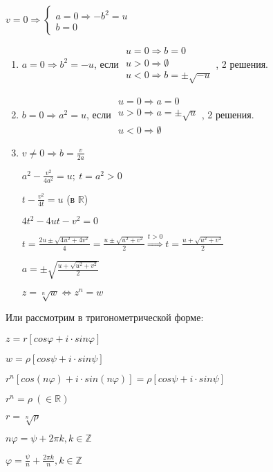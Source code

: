 \documentclass{article}
\begin{document}
    \( v = 0 \Rightarrow \begin{cases} a = 0 \Rightarrow -b^2 = u\\ b = 0\end{cases} \)
    \begin{enumerate}
        \item \( a = 0 \Rightarrow b^2 = -u \), если \( \begin{array}{l} u = 0 \Rightarrow b = 0\\ u > 0 \Rightarrow \emptyset\\ u < 0 \Rightarrow b = \pm \sqrt{-u} \end{array} \), 2 решения.

        \item \(b = 0 \Rightarrow a^2 = u\), если \(\begin{array}{l}u = 0 \Rightarrow a = 0\\ u > 0 \Rightarrow a = \pm \sqrt{u}\\ u < 0 \Rightarrow \emptyset\end{array}\), 2 решения.

        \item \(v \neq 0 \Rightarrow b = \frac{v}{2a}\)

        \(a^2 - \frac{v^2}{4a^2} = u;\ t = a^2 > 0\)
        
        \(t - \frac{v^2}{4t} = u\) (в \( \mathbb{R} \))

        \(4t^2-4ut-v^2 = 0\)

        \(t = \frac{2u \pm \sqrt{4u^2+4v^2}}{4}=\frac{u\pm\sqrt{u^2+v^2}}{2} \stackrel{t>0}{\Rightarrow} t = \frac{u+\sqrt{u^2+v^2}}{2}\)

        \(a = \pm\sqrt{\frac{u+\sqrt{u^2+v^2}}{2}}\)

        \( z = \sqrt[n]{w} \Leftrightarrow z^n = w \)
    \end{enumerate}

    Или рассмотрим в тригонометрической форме:

    \( z = r[cos\varphi + i\cdot sin\varphi] \)

    \( w = \rho[cos\psi + i\cdot sin\psi] \)

    \( r^n[cos(n\varphi) + i\cdot sin(n\varphi)] = \rho[cos\psi + i\cdot sin\psi] \)

    \( r^n = \rho\ (\in \mathbb{R})\)

    \( r = \sqrt[n]{\rho} \)

    \( n\varphi = \psi + 2\pi k, k \in \mathbb{Z} \)

    \( \varphi = \frac{\psi}{n} + \frac{2\pi k}{n}, k \in \mathbb{Z} \)
    
\end{document}
